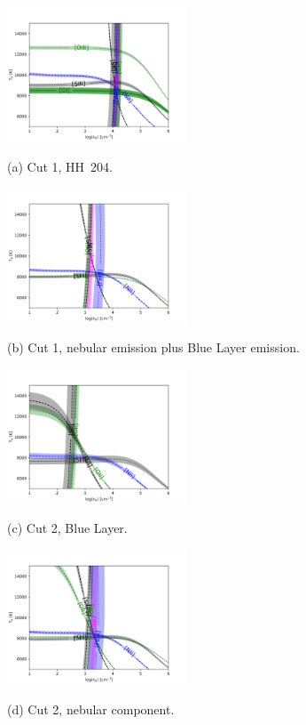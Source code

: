 \documentclass[twocolumn,linenumbers]{aastex63}
\begin{document}
\begin{figure}
\centering
  \begin{minipage}{7.5cm}
    \centering\includegraphics[height=4cm,width=\columnwidth]{physical_diag_HH204.png}

    \centerline{(a) Cut 1, HH~204.}
    \smallskip
  \end{minipage}
  \begin{minipage}{7.5cm}
    \centering\includegraphics[height=4cm,width=\columnwidth]{physical_diag_nebandbluelayer.png}
    \centerline{(b) Cut 1, nebular emission plus Blue Layer emission.}
    \smallskip
  \end{minipage}
 
  \begin{minipage}{7.5cm}
    \centering\includegraphics[height=4cm,width=\columnwidth]{physical_diag_blue_layer.png}
    \centerline{(c) Cut 2, Blue Layer.}
    \smallskip
  \end{minipage}
  \begin{minipage}{7.5cm}

    \centering\includegraphics[height=4cm,width=\columnwidth]{physical_diag_nebular.png}
    \centerline{(d) Cut 2, nebular component.}
    \smallskip
  \end{minipage}


\end{figure}
\end{document}

